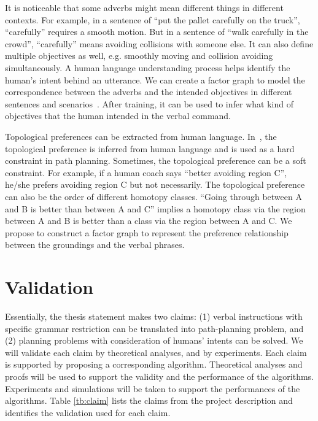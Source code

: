 \documentclass[phd]{byuprop}
\begin{document}
It is noticeable that some adverbs might mean different things in different contexts.
For example, in a sentence of ``put the pallet carefully on the truck'', ``carefully'' requires a smooth motion. 
But in a sentence of ``walk carefully in the crowd'', ``carefully'' means avoiding collisions with someone else.
It can also define multiple objectives as well, e.g. smoothly moving and collision avoiding simultaneously.
A human language understanding process helps identify the human's intent behind an utterance.
We can create a factor graph to model the correspondence between the adverbs and the intended objectives in different sentences and scenarios~\cite{tellex2011understanding}.
After training, it can be used to infer what kind of objectives that the human intended in the verbal command.

Topological preferences can be extracted from human language.
In~\cite{howard2014natural}, the topological preference is inferred from human language and is used as a hard constraint in path planning.
Sometimes, the topological preference can be a soft constraint.
For example, if a human coach says ``better avoiding region C'', he/she prefers avoiding region C but not necessarily.
The topological preference can also be the order of different homotopy classes.
``Going through between A and B is better than between A and C'' implies a homotopy class via the region between A and B is better than a class via the region between A and C.
We propose to construct a factor graph to represent the preference relationship between the groundings and the verbal phrases.


\section{Validation}
\label{sec:validation}

Essentially, the thesis statement makes two claims:
(1) verbal instructions with specific grammar restriction can be translated into path-planning problem,
and (2) planning problems with  consideration of humans' intents can be solved.
We will validate each claim by theoretical analyses, and by experiments.
Each claim is supported by proposing a corresponding algorithm.
Theoretical analyses and proofs will be used to support the validity and the performance of the algorithms.
Experiments and simulations will be taken to support the performances of the algorithms.
Table \ref{tb:claim} lists the claims from the project description and identifies the validation used for each claim.
\end{document}

